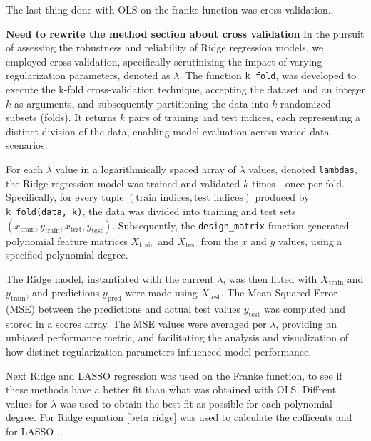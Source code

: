 \noindent The last thing done with OLS on the franke function was cross validation.. 

\textbf{Need to rewrite the method section about cross validation}
In the pursuit of assessing the robustness and reliability of Ridge regression models, we employed cross-validation, specifically scrutinizing the impact of varying regularization parameters, denoted as \(\lambda\). The function \texttt{k\_fold}, was developed to execute the k-fold cross-validation technique, accepting the dataset and an integer \(k\) as arguments, and subsequently partitioning the data into \(k\) randomized subsets (folds). It returns \(k\) pairs of training and test indices, each representing a distinct division of the data, enabling model evaluation across varied data scenarios.

For each \(\lambda\) value in a logarithmically spaced array of \(\lambda\) values, denoted \texttt{lambdas}, the Ridge regression model was trained and validated \(k\) times - once per fold. Specifically, for every tuple \((\text{train\_indices}, \text{test\_indices})\) produced by \texttt{k\_fold(data, k)}, the data was divided into training and test sets \((x_{\text{train}}, y_{\text{train}}, x_{\text{test}}, y_{\text{test}})\).
Subsequently, the \texttt{design\_matrix} function generated polynomial feature matrices \(X_{\text{train}}\) and \(X_{\text{test}}\) from the \(x\) and \(y\) values, using a specified polynomial degree. 

The Ridge model, instantiated with the current \(\lambda\), was then fitted with \(X_{\text{train}}\) and \(y_{\text{train}}\), and predictions \(y_{\text{pred}}\) were made using \(X_{\text{test}}\). The Mean Squared Error (MSE) between the predictions and actual test values \(y_{\text{test}}\) was computed and stored in a scores array.
The MSE values were averaged per \(\lambda\), providing an unbiased performance metric, and facilitating the analysis and visualization of how distinct regularization parameters influenced model performance.


\noindent Next Ridge and LASSO regression was used on the Franke function,
to see if these methods have a better fit than what was obtained with OLS.
Diffrent values for $\lambda$ was used to obtain the best fit as possible for each
polynomial degree. For Ridge equation \eqref{beta ridge} was used to calculate
the cofficents and for LASSO ..




